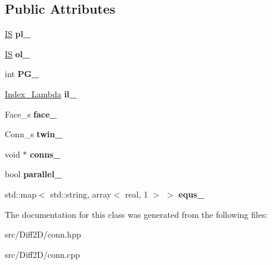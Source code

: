 \subsection*{Public Attributes}
\begin{DoxyCompactItemize}
\item 
\hypertarget{classConn_a61c9d519b93b91a14b4cc47a8cb8980b}{
\hyperlink{structIS}{IS} {\bfseries pl\_\-}}
\label{classConn_a61c9d519b93b91a14b4cc47a8cb8980b}

\item 
\hypertarget{classConn_a949773005bd6449b09e355e8f78dee47}{
\hyperlink{structIS}{IS} {\bfseries ol\_\-}}
\label{classConn_a949773005bd6449b09e355e8f78dee47}

\item 
\hypertarget{classConn_a8550bde616100c5f9cc23bc7ae267a18}{
int {\bfseries PG\_\-}}
\label{classConn_a8550bde616100c5f9cc23bc7ae267a18}

\item 
\hypertarget{classConn_a659caee9d9a125f24d7eb054ca2e5879}{
\hyperlink{structIndex__Lambda}{Index\_\-Lambda} {\bfseries il\_\-}}
\label{classConn_a659caee9d9a125f24d7eb054ca2e5879}

\item 
\hypertarget{classConn_a893abc608e559f12c5368edbd6da7b54}{
Face\_\-s {\bfseries face\_\-}}
\label{classConn_a893abc608e559f12c5368edbd6da7b54}

\item 
\hypertarget{classConn_a7578b2f58e208173f45436d7261271a0}{
Conn\_\-s {\bfseries twin\_\-}}
\label{classConn_a7578b2f58e208173f45436d7261271a0}

\item 
\hypertarget{classConn_ac571dea0fa3d37ed022872da32ad6c33}{
void $\ast$ {\bfseries conns\_\-}}
\label{classConn_ac571dea0fa3d37ed022872da32ad6c33}

\item 
\hypertarget{classConn_aae3bc6691f2e065bf44e8f1a2cd4e31f}{
bool {\bfseries parallel\_\-}}
\label{classConn_aae3bc6691f2e065bf44e8f1a2cd4e31f}

\item 
\hypertarget{classConn_a425d7d5713a82acbfa9a69adcc0c1c25}{
std::map$<$ std::string, array$<$ real, 1 $>$ $>$ {\bfseries equs\_\-}}
\label{classConn_a425d7d5713a82acbfa9a69adcc0c1c25}

\end{DoxyCompactItemize}


The documentation for this class was generated from the following files:\begin{DoxyCompactItemize}
\item 
src/Diff2D/conn.hpp\item 
src/Diff2D/conn.cpp\end{DoxyCompactItemize}
